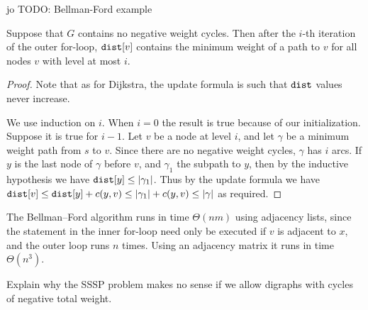 \begin{Boxample}[0]
jo TODO: Bellman-Ford example
\end{Boxample}


\begin{Theorem} 
Suppose that $G$ contains no negative weight cycles. Then after the $i$-th 
iteration of the outer for-loop, $\operatorname{\text{\texttt{dist}}}[v]$ contains the minimum weight of a 
path to $v$ for all nodes $v$ with level at most $i$.
\end{Theorem}
\begin{proof} 
Note that as for Dijkstra, the update formula is such that $\operatorname{\text{\texttt{dist}}}$ values never increase.

We use induction on $i$. When $i=0$ the result is true because of our
initialization. Suppose it is true for $i-1$. Let $v$ be a node at level
$i$, and let $\gamma$ be a minimum weight path from $s$ to $v$. Since
there are no negative weight cycles, $\gamma$ has $i$ arcs. If $y$
is the last node of $\gamma$ before $v$, and $\gamma_1$ the subpath to
$y$, then by the inductive hypothesis we have $\operatorname{\text{\texttt{dist}}}[y] \leq | \gamma_1
|$. Thus by the update formula we have $\operatorname{\text{\texttt{dist}}}[v] \leq \operatorname{\text{\texttt{dist}}}[y] + c(y, v)
\leq | \gamma_1 | + c(y, v) \leq | \gamma |$ as required.
\end{proof}

The Bellman--Ford algorithm runs in time $\Theta(nm)$ using adjacency
lists, since the statement in the inner for-loop need only be
executed if $v$ is adjacent to $x$, and the outer loop runs $n$
times. Using an adjacency matrix it runs in time $\Theta(n^3)$.

\begin{Boxample}[2] \label{ex:SSSP-neg-cycle}
Explain why the SSSP problem makes no sense if we allow digraphs with
cycles of negative total weight.
\end{Boxample}


